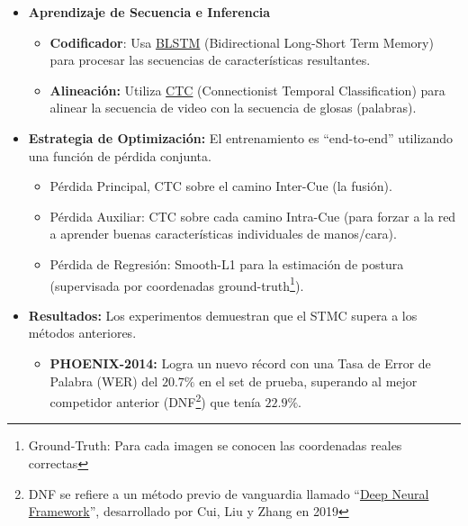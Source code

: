 \documentclass[11pt,a4paper]{article}
\begin{document}
\begin{itemize}
\begin{itemize}
		\begin{itemize}
			\item \textbf{Camino Intra-Cue (Intra-señal):} Modela la dependencia temporal interna de cada señal por separado (mantiene la unicidad de cada señal, ej. solo la mano).
			\item \textbf{Camino Inter-Cue (Inter-señal):} Fusiona la información de todas las señales para aprender la sinergia y colaboración entre ellas en diferentes escalas de tiempo.
			\item Utiliza convoluciones temporales (TCOV) y Pooling temporal
		\end{itemize}
		\item \textbf{Aprendizaje de Secuencia e Inferencia}
		\begin{itemize}
			\item \textbf{Codificador}: Usa \href{https://www.geeksforgeeks.org/nlp/bidirectional-lstm-in-nlp/}{BLSTM} (Bidirectional Long-Short Term Memory) para procesar las secuencias de características resultantes.
			\item \textbf{Alineación:} Utiliza \href{https://en.wikipedia.org/wiki/Connectionist_temporal_classification}{CTC} (Connectionist Temporal Classification) para alinear la secuencia de video con la secuencia de glosas (palabras).
		\end{itemize}
		\item \textbf{Estrategia de Optimización:} El entrenamiento es ``end-to-end'' utilizando una función de pérdida conjunta.
		\begin{itemize}
			\item Pérdida Principal, CTC sobre el camino Inter-Cue (la fusión).
			\item Pérdida Auxiliar: CTC sobre cada camino Intra-Cue (para forzar a la red a aprender buenas características individuales de manos/cara).
			\item Pérdida de Regresión: Smooth-L1 para la estimación de postura (supervisada por coordenadas ground-truth\footnote{Ground-Truth: Para cada imagen se conocen las coordenadas reales correctas}).
		\end{itemize}
		\item \textbf{Resultados:} Los experimentos demuestran que el STMC supera a los métodos anteriores.
		\begin{itemize}
			\item \textbf{PHOENIX-2014:} Logra un nuevo récord con una Tasa de Error de Palabra (WER) del $20.7\%$ en el set de prueba, superando al mejor competidor anterior (DNF\footnote{DNF se refiere a un método previo de vanguardia llamado ``\href{https://www.researchgate.net/publication/398875768_A_Deep_Neural_Framework_for_Continuous_Sign_Language_Recognition_via_Iterative_Training}{Deep Neural Framework}'', desarrollado por Cui, Liu y Zhang en 2019}) que tenía $22.9\%$.

\end{itemize}
\end{itemize}
\end{itemize}
\end{document}
